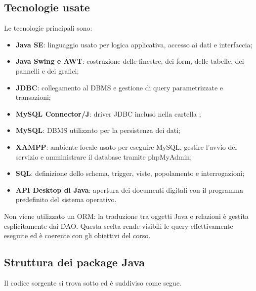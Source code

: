 \documentclass[11pt,a4paper]{article}
\begin{document}
\subsection{Tecnologie usate}
Le tecnologie principali sono:
\begin{itemize}
    \item \textbf{Java SE}: linguaggio usato per logica applicativa, accesso ai dati e interfaccia;
    \item \textbf{Java Swing e AWT}: costruzione delle finestre, dei form, delle tabelle, dei pannelli e dei grafici;
    \item \textbf{JDBC}: collegamento al DBMS e gestione di query parametrizzate e transazioni;
    \item \textbf{MySQL Connector/J}: driver JDBC incluso nella cartella ;
    \item \textbf{MySQL}: DBMS utilizzato per la persistenza dei dati;
    \item \textbf{XAMPP}: ambiente locale usato per eseguire MySQL, gestire l'avvio del servizio e amministrare il database tramite phpMyAdmin;
    \item \textbf{SQL}: definizione dello schema, trigger, viste, popolamento e interrogazioni;
    \item \textbf{API Desktop di Java}: apertura dei documenti digitali con il programma predefinito del sistema operativo.
\end{itemize}
Non viene utilizzato un ORM: la traduzione tra oggetti Java e relazioni è gestita esplicitamente dai DAO. Questa scelta rende visibili le query effettivamente eseguite ed è coerente con gli obiettivi del corso.

\subsection{Struttura dei package Java}
Il codice sorgente si trova sotto  ed è suddiviso come segue.
\end{document}
